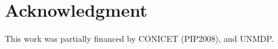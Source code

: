 \documentclass[a4paper]{elsart}
\begin{document}










\section*{Acknowledgment}
This work was partially financed by CONICET (PIP2008),  and UNMDP.



\end{document}
